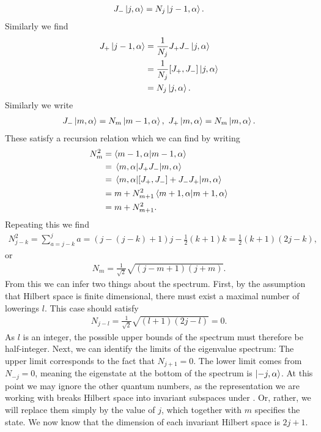 \begin{align*}
	J_{-}\ket{j, \alpha} = N_{j}\ket{j - 1, \alpha}.
\end{align*}
Similarly we find
\begin{align*}
	J_{+}\ket{j - 1, \alpha} &= \frac{1}{N_{j}}J_{+}J_{-}\ket{j, \alpha} \\
	                         &= \frac{1}{N_{j}}\comm{J_{+}}{J_{-}}\ket{j, \alpha} \\
	                         &= N_{j}\ket{j, \alpha}.
\end{align*}
Similarly we write
\begin{align*}
	J_{-}\ket{m, \alpha} = N_{m}\ket{m - 1, \alpha},\ J_{+}\ket{m, \alpha} = N_{m}\ket{m, \alpha}.
\end{align*}
These satisfy a recursion relation which we can find by writing
\begin{align*}
	N_{m}^{2} &= \braket{m - 1, \alpha}{m - 1, \alpha} \\
	          &= \mel{m, \alpha}{J_{+}J_{-}}{m, \alpha} \\
	          &= \mel{m, \alpha}{\comm{J_{+}}{J_{-}} + J_{-}J_{+}}{m, \alpha} \\
	          &= m + N_{m + 1}^{2}\braket{m + 1, \alpha}{m + 1, \alpha} \\
	          &= m + N_{m + 1}^{2}.
\end{align*}
Repeating this we find
\begin{align*}
	N_{j - k}^{2} = \sum\limits_{a = j - k}^{j}a = (j - (j - k) + 1)j - \frac{1}{2}(k + 1)k = \frac{1}{2}(k + 1)(2j - k),
\end{align*}
or
\begin{align*}
	N_{m} = \frac{1}{\sqrt{2}}\sqrt{(j - m + 1)(j + m)}.
\end{align*}
From this we can infer two things about the spectrum. First, by the assumption that Hilbert space is finite dimensional, there must exist a maximal number of lowerings $l$. This case should satisfy
\begin{align*}
	N_{j - l} = \frac{1}{\sqrt{2}}\sqrt{(l + 1)(2j - l)} = 0.
\end{align*}
As $l$ is an integer, the possible upper bounds of the spectrum must therefore be half-integer. Next, we can identify the limits of the eigenvalue spectrum: The upper limit corresponds to the fact that $N_{j + 1} = 0$. The lower limit comes from $N_{-j} = 0$, meaning the eigenstate at the bottom of the spectrum is $\ket{-j, \alpha}$. At this point we may ignore the other quantum numbers, as the representation we are working with breaks Hilbert space into invariant subspaces under . Or, rather, we will replace them simply by the value of $j$, which together with $m$ specifies the state. We now know that the dimension of each invariant Hilbert space is $2j + 1$.

